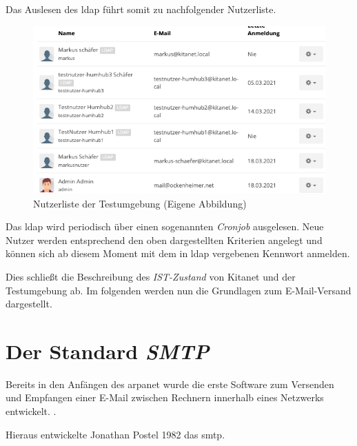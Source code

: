 Das Auslesen des \ac{ldap} führt somit zu nachfolgender Nutzerliste.

\begin{figure}[h]
  \centering
  \includegraphics[width=1.0\textwidth]{res/nutzerliste.png}
  \caption{Nutzerliste der Testumgebung (Eigene Abbildung)}
  \label{fig:Nutzerliste}
\end{figure}

Das \ac{ldap} wird periodisch über einen sogenannten \textit{Cronjob} ausgelesen. Neue Nutzer werden entsprechend den oben dargestellten Kriterien angelegt und können sich ab diesem Moment mit dem in \ac{ldap} vergebenen Kennwort anmelden.

Dies schließt die Beschreibung des \textit{IST-Zustand} von Kitanet und der Testumgebung ab. Im folgenden werden nun die Grundlagen zum E-Mail-Versand dargestellt.

\chapter{Der Standard \textit{SMTP}}
\label{sec:Der Standard}
Bereits in den Anfängen des \ac{arpanet} wurde die erste Software zum Versenden und Empfangen einer E-Mail zwischen Rechnern innerhalb eines Netzwerks entwickelt.  \citep[][]{historyinternet}.

Hieraus entwickelte Jonathan Postel 1982 das \acf{smtp}.


